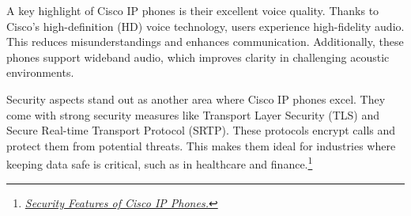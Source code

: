 \documentclass[11pt,a4paper]{article}
\begin{document}
A key highlight of Cisco IP phones is their excellent voice quality. Thanks to Cisco's high-definition (HD) voice technology, users experience high-fidelity audio. This reduces misunderstandings and enhances communication. Additionally, these phones support wideband audio, which improves clarity in challenging acoustic environments.

Security aspects stand out as another area where Cisco IP phones excel. They come with strong security measures like Transport Layer Security (TLS) and Secure Real-time Transport Protocol (SRTP). These protocols encrypt calls and protect them from potential threats. This makes them ideal for industries where keeping data safe is critical, such as in healthcare and finance.\footnote{\href{https://www.cisco.com/c/dam/en/us/products/collateral/collaboration-endpoints/unified-ip-phone-8800-series/white-paper-c11-739097.pdf}{\textit{Security Features of Cisco IP Phones.}}}
\end{document}

